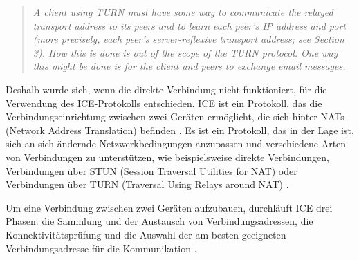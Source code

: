 \begin{quote}
    \textit{A client using TURN must have some way to communicate the relayed transport address to its
    peers and to learn each peer's IP address and port (more precisely, each peer's server-reflexive
    transport address; see Section 3). How this is done is out of the scope of the TURN protocol. One
    way this might be done is for the client and peers to exchange email messages.} \parencite[S. 7]{rfc8656_TURN}
\end{quote}


\noindent Deshalb wurde sich, wenn die direkte Verbindung nicht funktioniert, für die Verwendung des ICE-Protokolls entschieden. ICE ist ein Protokoll, das die Verbindungseinrichtung zwischen zwei Geräten ermöglicht, die sich hinter NATs (Network Address Translation) befinden \parencite[S. 6-7]{rfc8445_ICE}. Es ist ein Protokoll, das in der Lage ist, sich an sich ändernde Netzwerkbedingungen anzupassen und verschiedene Arten von Verbindungen zu unterstützen, wie beispielsweise direkte Verbindungen, Verbindungen über STUN (Session Traversal Utilities for NAT) oder Verbindungen über TURN (Traversal Using Relays around NAT) \parencite[S. 1]{rfc8445_ICE}. 

Um eine Verbindung zwischen zwei Geräten aufzubauen, durchläuft ICE drei Phasen: die Sammlung und der Austausch von Verbindungsadressen, die Konnektivitätsprüfung und die Auswahl der am besten geeigneten Verbindungsadresse für die Kommunikation \parencite{rfc8445_ICE}.

